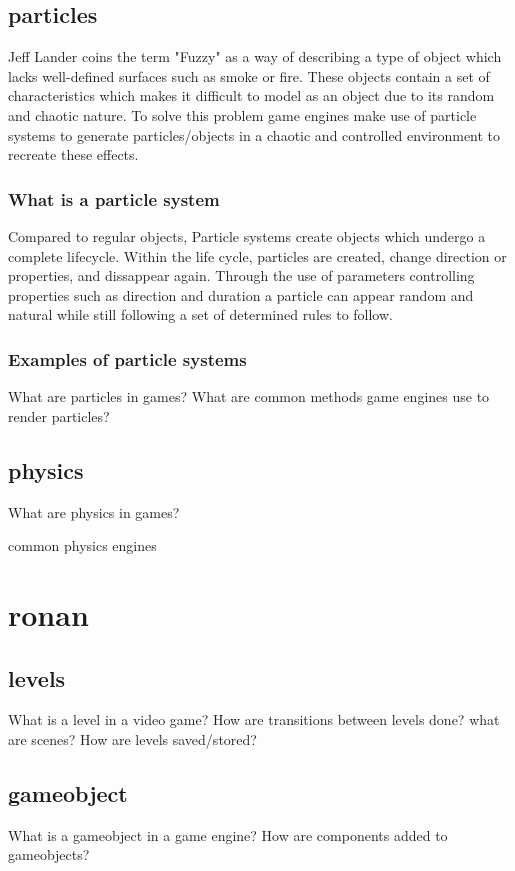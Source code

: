 \documentclass{article} %
\begin{document}
\subsection{particles}

Jeff Lander coins the term "Fuzzy" as a way of describing a type of object which lacks well-defined surfaces such as smoke or fire. \cite{Lander_1998} These objects contain a set of characteristics which makes it difficult to model as an object due to its random and chaotic nature. To solve this problem game engines make use of particle systems to generate particles/objects in a chaotic and controlled environment to recreate these effects.

\subsubsection{What is a particle system}

Compared to regular objects, Particle systems create objects which undergo a complete lifecycle. Within the life cycle, particles are created, change direction or properties, and dissappear again. Through the use of parameters controlling properties such as direction and duration a particle can appear random and natural while still following a set of determined rules to follow.

\subsubsection{Examples of particle systems}



What are particles in games?
What are common methods game engines use to render particles?
\subsection{physics}
What are physics in games?

common physics engines

\newpage

\section{ronan}
\subsection{levels}
What is a level in a video game?
How are transitions between levels done?
what are scenes?
How are levels saved/stored?
\subsection{gameobject}
What is a gameobject in a game engine?
How are components added to gameobjects?
\end{document}
